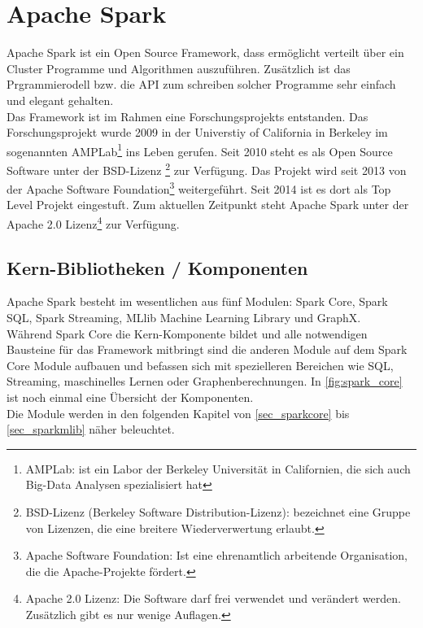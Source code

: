 \newpage
\chapter{Apache Spark} 

Apache Spark ist ein Open Source Framework, dass ermöglicht verteilt über ein Cluster Programme und Algorithmen auszuführen. Zusätzlich ist das Prgrammierodell bzw. die API zum schreiben solcher Programme sehr einfach und elegant gehalten. \cite{AAWS15} \\

\noindent
Das Framework ist im Rahmen eine Forschungsprojekts entstanden. Das Forschungsprojekt wurde 2009 in der Universtiy of California in Berkeley im sogenannten AMPLab\footnote{AMPLab: ist ein Labor der Berkeley Universität in Californien, die sich auch Big-Data Analysen spezialisiert hat } ins Leben gerufen. Seit 2010 steht es als Open Source Software unter der BSD-Lizenz \footnote{BSD-Lizenz (Berkeley Software Distribution-Lizenz): bezeichnet eine Gruppe von Lizenzen, die eine breitere Wiederverwertung erlaubt.} zur Verfügung. Das Projekt wird seit 2013 von der Apache Software Foundation\footnote{Apache Software Foundation: Ist eine ehrenamtlich arbeitende Organisation, die die Apache-Projekte fördert.} weitergeführt. Seit 2014 ist es dort als Top Level Projekt eingestuft. Zum aktuellen Zeitpunkt steht Apache Spark unter der Apache 2.0 Lizenz\footnote{Apache 2.0 Lizenz: Die Software darf frei verwendet und verändert werden. Zusätzlich gibt es nur wenige Auflagen.} zur Verfügung. \\



\section{Kern-Bibliotheken / Komponenten}

Apache Spark besteht im wesentlichen aus fünf Modulen: Spark Core, Spark SQL, Spark Streaming, MLlib Machine Learning Library und GraphX. \\
\noindent
Während Spark Core die Kern-Komponente bildet und alle notwendigen Bausteine für das Framework mitbringt sind die anderen Module auf dem Spark Core Module aufbauen und befassen sich mit spezielleren Bereichen wie SQL, Streaming, maschinelles Lernen oder Graphenberechnungen. In \autoref{fig:spark_core} ist noch einmal eine Übersicht der Komponenten. \\
\noindent
Die Module werden in den folgenden Kapitel von \ref{sec_sparkcore} bis \ref{sec_sparkmlib} näher beleuchtet. \\


